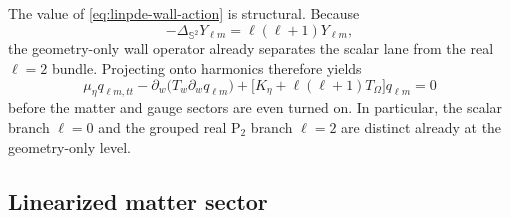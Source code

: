 \documentclass[11pt]{article}
\theoremstyle{definition}
\newcommand{\Ptwo}{\ensuremath{\mathrm{P}_2}}
\newcommand{\bbS}{\mathbb S}
\begin{document}
The value of \eqref{eq:linpde-wall-action} is structural. Because
\[
-\Delta_{\bbS^2}Y_{\ell m}=\ell(\ell+1)Y_{\ell m},
\]
the geometry-only wall operator already separates the scalar lane from the real $\ell=2$ bundle. Projecting onto harmonics therefore yields
\begin{equation}
\mu_\eta q_{\ell m,tt}
-
\partial_w\!\bigl(T_w\partial_w q_{\ell m}\bigr)
+
\bigl[K_\eta+\ell(\ell+1)T_\Omega\bigr]q_{\ell m}
=
0
\label{eq:linpde-wall-modal-free}
\end{equation}
before the matter and gauge sectors are even turned on. In particular, the scalar branch $\ell=0$ and the grouped real $\Ptwo$ branch $\ell=2$ are distinct already at the geometry-only level.

\subsection{Linearized matter sector}
\end{document}
